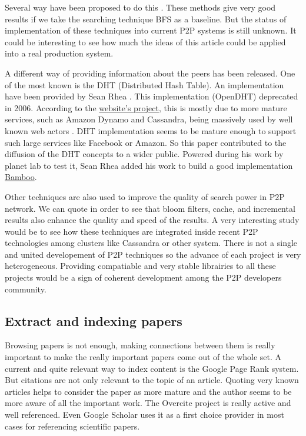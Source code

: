 Several way have been proposed to do this \cite{Yang02improvingsearch}. These methods give
very good results if we take the searching technique BFS as a baseline. But the status of implementation
of these techniques into current P2P systems is still unknown. It could be interesting to see how much
the ideas of this article could be applied into a real production system.

A different way of providing information about the peers has been released.
One of the most known is
the DHT (Distributed Hash Table). An implementation have been provided
by Sean Rhea \cite{Rhea:2005:OPD:1090191.1080102}.
This implementation (OpenDHT) deprecated in 2006. According to the 
\href{http://opendht.org}{website's project}, this is mostly due to
more mature services, such as Amazon Dynamo and Cassandra,
being massively used by well known web actors . DHT implementation seems 
to be mature enough to support such large
services like Facebook or Amazon. So this paper contributed
 to the diffusion of the DHT concepts to a wider public.
Powered during his work by planet lab to test it, Sean Rhea added 
his work to build a good implementation \href{bamboo-dht.org}{Bamboo}.

Other techniques are also used to improve the quality of search power in P2P network. We can quote
\cite{Reynolds_efficientpeer-to-peer} in order to see that bloom filters, cache, and incremental
results also enhance the quality and speed of the results. A very interesting study would be to
see how these techniques are integrated inside recent P2P technologies among clusters like Cassandra
or other system. There is not a single and united developement of P2P techniques so the advance of 
each project is very heterogeneous. Providing compatiable and very stable librairies to all these projects would
be a sign of coherent development among the P2P developers community.

\subsection{Extract and indexing papers}

Browsing papers is not enough, making connections between them is really important to make the really 
important papers come out of the whole set. A current and quite relevant way to
index content is the Google Page Rank system. But citations are not only relevant to the 
topic of an article. Quoting very known articles helps to consider the paper as more mature
and the author seems to be more aware of all the important work\cite{Lawrence99digitallibraries}. The Overcite project
is really 
active and well referenced. Even Google Scholar uses it as a first choice provider in most cases
for referencing scientific papers.

\pagebreak

